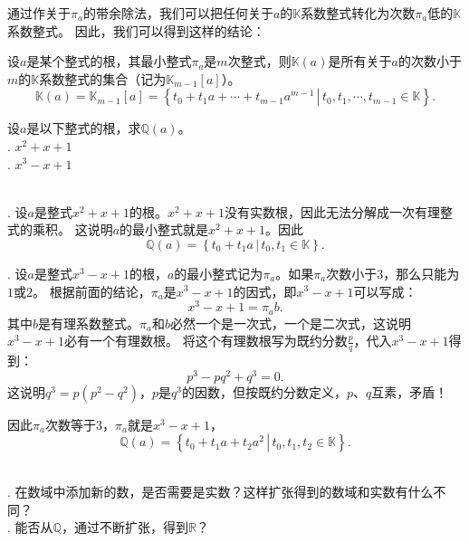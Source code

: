 \documentclass[12pt,UTF8,fontset=none]{ctexbook}
\begin{document}
通过作关于$\pi_a$的带余除法，我们可以把任何关于$a$的$\mathbb{K}$系数整式转化为次数$\pi_a$低的$\mathbb{K}$系数整式。
因此，我们可以得到这样的结论：

\begin{tm}
    设$a$是某个整式的根，其最小整式$\pi_a$是$m$次整式，则$\mathbb{K}(a)$是所有关于$a$的次数小于$m$的$\mathbb{K}$系数整式的集合（记为$\mathbb{K}_{m-1}[a]$）。
    $$\mathbb{K}(a) = \mathbb{K}_{m-1}[a] = \left\{\left.t_0 + t_1 a + \cdots + t_{m-1} a^{m-1} \, \right| \, t_0, t_1, \cdots , t_{m-1} \in \mathbb{K} \right\}.$$
\end{tm}

\begin{et}
    设$a$是以下整式的根，求$\mathbb{Q}(a)$。\\
    . $x^2 + x + 1 $\\
    . $x^3 - x + 1 $
\end{et}

\begin{so}
    \mbox{} \\
    . 设$a$是整式$x^2 + x + 1 $的根。$x^2 + x + 1 $没有实数根，因此无法分解成一次有理整式的乘积。
    这说明$a$的最小整式就是$x^2 + x + 1 $。因此
    $$\mathbb{Q}(a) = \left\{\left.t_0 + t_1 a \, \right| \, t_0, t_1 \in \mathbb{K} \right\}. $$
    
    . 设$a$是整式$x^3 - x + 1 $的根，$a$的最小整式记为$\pi_a$。如果$\pi_a$次数小于$3$，那么只能为$1$或$2$。
    根据前面的结论，$\pi_a$是$x^3 - x + 1 $的因式，即$x^3 - x + 1 $可以写成：
    $$x^3 - x + 1 = \pi_a b. $$
    其中$b$是有理系数整式。$\pi_a$和$b$必然一个是一次式，一个是二次式，这说明$x^3 - x + 1 $必有一个有理数根。
    将这个有理数根写为既约分数$\displaystyle \frac{p}{q}$，代入$x^3 - x + 1 $得到：
    $$ p^3 - pq^2 + q^3 = 0.$$
    这说明$q^3 = p(p^2 - q^2)$，$p$是$q^3$的因数，但按既约分数定义，$p$、$q$互素，矛盾！

    因此$\pi_a$次数等于$3$，$\pi_a$就是$x^3 - x + 1 $，
    $$\mathbb{Q}(a) = \left\{\left.t_0 + t_1 a + t_2 a^2 \, \right| \, t_0, t_1, t_2 \in \mathbb{K} \right\}. $$
\end{so}

\begin{sk}
    \mbox{} \\
    . 在数域中添加新的数，是否需要是实数？这样扩张得到的数域和实数有什么不同？\\
    . 能否从$\mathbb{Q}$，通过不断扩张，得到$\mathbb{R}$？
\end{sk}
\end{document}
